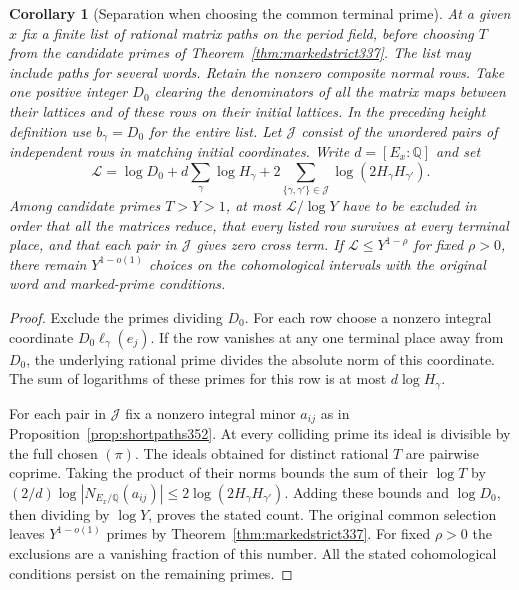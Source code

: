 \documentclass[a4paper,11pt]{article}
\newtheorem{corollary}[proposition]{Corollary}
\theoremstyle{definition}
\theoremstyle{remark}
\numberwithin{equation}{section}
\begin{document}
\begin{corollary}[Separation when choosing the common terminal prime]\leavevmode
\label{cor:pathprimes352}
At a given \(x\) fix a finite list of rational matrix paths on
the period field, before choosing \(T\) from the candidate primes
of Theorem~\ref{thm:markedstrict337}. The list may include paths
for several words. Retain the nonzero composite normal rows.
Take one positive integer \(D_0\) clearing the denominators of
all the matrix maps between their lattices and of these rows
on their initial lattices. In the preceding height definition
use \(b_\gamma=D_0\) for the entire list. Let \(\mathcal J\)
consist of the unordered pairs of independent rows in matching
initial coordinates. Write \(d=[E_x:\mathbb Q]\) and set
\[
 \mathcal L=\log D_0+d\sum_\gamma\log H_\gamma+
              2\sum_{\{\gamma,\gamma'\}\in\mathcal J}
                         \log(2H_\gamma H_{\gamma'}).
\]
Among candidate primes \(T>Y>1\), at most
\(\mathcal L/\log Y\) have to be excluded in order that all
the matrices reduce, that every listed row survives at every
terminal place, and that each pair in \(\mathcal J\) gives zero
cross term. If \(\mathcal L\le Y^{1-\rho}\) for fixed \(\rho>0\),
there remain \(Y^{1-o(1)}\) choices on the cohomological intervals
with the original word and marked-prime conditions.
\end{corollary}
\begin{proof}
Exclude the primes dividing \(D_0\). For each row choose a
nonzero integral coordinate \(D_0\ell_\gamma(e_j)\). If the
row vanishes at any one terminal place away from \(D_0\), the
underlying rational prime divides the absolute norm of this
coordinate. The sum of logarithms of these primes for this
row is at most \(d\log H_\gamma\).

For each pair in \(\mathcal J\) fix a nonzero integral minor
\(a_{ij}\) as in Proposition~\ref{prop:shortpaths352}. At every
colliding prime its ideal is divisible by the full chosen
\((\pi)\). The ideals obtained for distinct rational \(T\) are
pairwise coprime. Taking the product of their norms bounds
the sum of their \(\log T\) by
\((2/d)\log|N_{E_x/\mathbb Q}(a_{ij})|
\le2\log(2H_\gamma H_{\gamma'})\).
Adding these bounds and \(\log D_0\), then dividing by \(\log Y\),
proves the stated count. The original common selection leaves
\(Y^{1-o(1)}\) primes by Theorem~\ref{thm:markedstrict337}.
For fixed \(\rho>0\) the exclusions are a vanishing fraction
of this number. All the stated cohomological conditions persist
on the remaining primes.
\end{proof}
\end{document}
